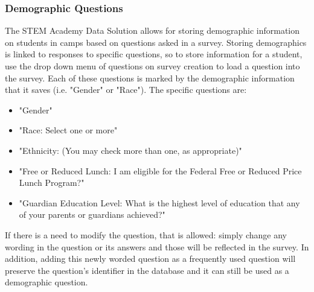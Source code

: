 \documentclass[letterpaper,10pt,serif, draftclsnofoot,onecolumn, compsoc, titlepage]{IEEEtran}
\begin{document}
\subsubsection{Demographic Questions}
The STEM Academy Data Solution allows for storing demographic information on students in camps based on questions asked in a survey.
Storing demographics is linked to responses to specific questions, so to store information for a student, use the drop down menu of questions on survey creation to load a question into the survey.
Each of these questions is marked by the demographic information that it saves (i.e. "Gender" or "Race").
The specific questions are:
\begin{itemize}
	\item "Gender"
	\item "Race: Select one or more"
	\item "Ethnicity: (You may check more than one, as appropriate)"
	\item "Free or Reduced Lunch: I am eligible for the Federal Free or Reduced Price Lunch Program?"
	\item "Guardian Education Level: What is the highest level of education that any of your parents or guardians achieved?"
\end{itemize}
If there is a need to modify the question, that is allowed: simply change any wording in the question or its answers and those will be reflected in the survey.
In addition, adding this newly worded question as a frequently used question will preserve the question's identifier in the database and it can still be used as a demographic question.
\end{document}
